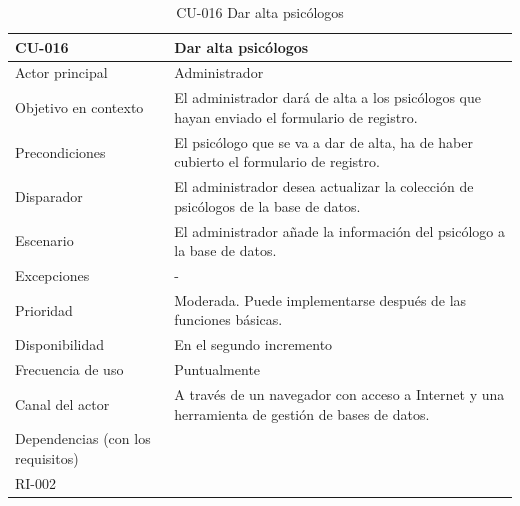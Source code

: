\clearpage


\begin{table}[htpb]
\centering
\begin{tabularx}{\textwidth}{|X|X|}
\hline
\rowcolor[gray]{0.9}\textbf{CU-016}                            & \textbf{Dar alta psicólogos                                                                           } \\ \hline
Actor principal                   & Administrador                                                                                  \\ \hline
Objetivo en contexto              & El administrador dará de alta a los psicólogos que hayan enviado el formulario de registro.    \\ \hline
Precondiciones                    & El psicólogo que se va a dar de alta, ha de haber cubierto el formulario de registro.          \\ \hline
Disparador                        & El administrador desea actualizar la colección de psicólogos de la base de datos.              \\ \hline
Escenario                         & El administrador añade la información del psicólogo a la base de datos.                        \\ \hline
Excepciones                       & -                                                                                              \\ \hline
Prioridad                         & Moderada. Puede implementarse después de las funciones básicas.                                \\ \hline
Disponibilidad                    & En el segundo incremento                                                                       \\ \hline
Frecuencia de uso                 & Puntualmente                                                                                   \\ \hline
Canal del actor                   & A través de un navegador con acceso a Internet y una herramienta de gestión de bases de datos. \\ \hline
Dependencias (con los requisitos) & \begin{tabular}[c]{@{}l@{}}RI-003\\ RI-002\end{tabular}                                        \\ \hline
\end{tabularx}
\caption{CU-016 Dar alta psicólogos}                          
\end{table}

